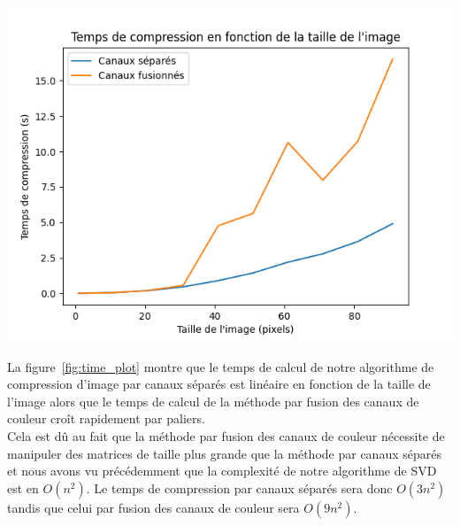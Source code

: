 \documentclass{article}
\begin{document}
\begin{minipage}{0.45\textwidth}
  \centering
  \includegraphics[width=\textwidth]{time_plot.png}
  \label{fig:time_plot}
\end{minipage}
\hfill
\begin{minipage}{0.5\textwidth}
  La figure~\ref{fig:time_plot} montre que le temps de calcul de notre algorithme de compression d'image par canaux séparés est linéaire en fonction de la taille de l'image alors que le temps de calcul de la méthode par fusion des canaux de couleur croît rapidement par paliers.\\
  Cela est dû au fait que la méthode par fusion des canaux de couleur nécessite de manipuler des matrices de taille plus grande que la méthode par canaux séparés et nous avons vu précédemment que la complexité de notre algorithme de SVD est en $O(n^2)$. Le temps de compression par canaux séparés sera donc $O(3n^2)$ tandis que celui par fusion des canaux de couleur sera $O(9n^2)$.
\end{minipage}
\end{document}
